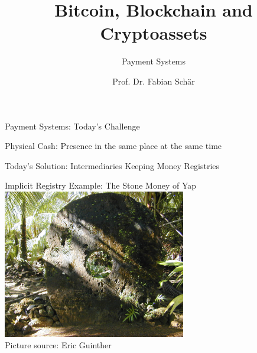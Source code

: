 \documentclass[handout]{beamer}
\title{Bitcoin, Blockchain and Cryptoassets}
\subtitle{Payment Systems}
\author{Prof. Dr. Fabian Schär}
\institute{University of Basel}
\begin{document}
\thispagestyle{empty}
\begin{frame}[noframenumbering]
	\titlepage
\end{frame}

\begin{frame}{Payment Systems: Today's Challenge}

Physical Cash: Presence in the same place at the same time
\begin{figure}[h]
	\center
		
\end{figure}

\vspace{1.5 em}

	
\end{frame}

\begin{frame}{Today's Solution: Intermediaries Keeping Money Registries}

\begin{figure}[h]
	\center
		
\end{figure}

	
\end{frame}

\begin{frame}{Implicit Registry Example: The Stone Money of Yap}
	\center
	\includegraphics[width=8cm]{../assets/images/yap_stones}\\
	\footnotesize{Picture source: Eric Guinther}
\end{frame}
\end{document}
